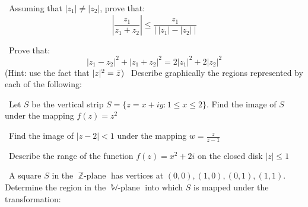 \documentclass[12pt]{exam}
\DeclareMathOperator{\zbb}{\mathbb{Z}-plane}
\DeclareMathOperator{\wbb}{\mathbb{W}-plane}
\begin{document}
\begin{questions}

\vspace{1em}

\question\ Assuming that \(|z_1| \neq |z_2|\), prove that:
\begin{equation*}
    \left|\frac{z_1}{z_1 + z_2}\right| \leq \frac{z_1}{\left| \ |z_1| - |z_2| \ \right|}
\end{equation*}

\vspace{1em}

\question\ Prove that:
\begin{equation*}
    |z_1 - z_2|^2 + |z_1 + z_2|^2 = 2 |z_1|^2 + 2 |z_2|^2
\end{equation*}
(Hint: use the fact that \(|z|^2 = \Bar{z}\))
\newpage
\question\ Describe graphically the regions represented by each of the following:


\question\ Let \(S\) be the vertical strip \(S = \{ z = x + iy : 1 \leq x \leq 2\}\). Find the image of \(S\) under the mapping \(f(z) = z^2\)

\question\ Find the image of \(|z-2| < 1\) under the mapping \(\displaystyle w = \frac{z}{z - 1}\)

\question\ Describe the range of the function \(f(z) = x^2 + 2i\) on the closed disk \(|z| \leq 1\)

\question\ A square \(S\) in the \(\zbb\) has vertices at \((0,0), (1,0), (0,1), (1,1)\). Determine the region in the \(\wbb\) into which \(S\) is mapped under the transformation:


\end{questions}
\end{document}
